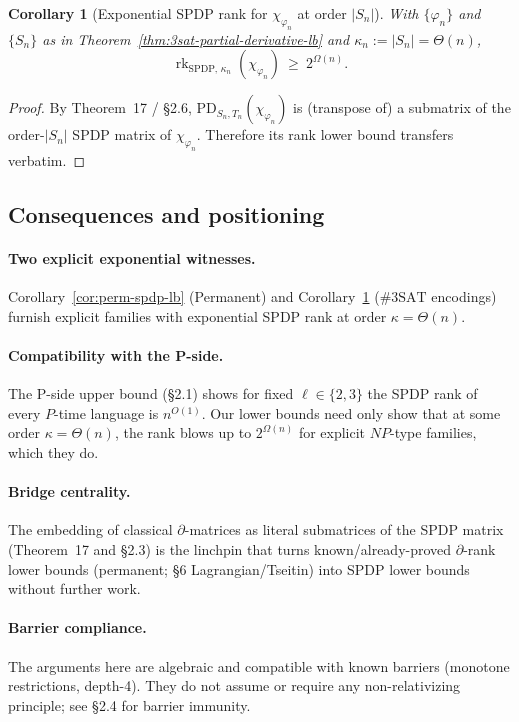 \documentclass[12pt]{article}
\newtheorem{corollary}[theorem]{Corollary}
\theoremstyle{definition}
\theoremstyle{definition}
\theoremstyle{remark}
\theoremstyle{remark}
\begin{document}
\begin{corollary}[Exponential SPDP rank for $\chi_{\varphi_n}$ at order $|S_n|$]\label{cor:3sat-spdp-lb}
With $\{\varphi_n\}$ and $\{S_n\}$ as in Theorem~\ref{thm:3sat-partial-derivative-lb} and $\kappa_n:=|S_n|=\Theta(n)$,
\[
\operatorname{rk}_{\mathrm{SPDP},\,\kappa_n}(\chi_{\varphi_n})\ \ge\ 2^{\Omega(n)}.
\]
\end{corollary}

\begin{proof}
By Theorem~17 / \S2.6, $\mathrm{PD}_{S_n,T_n}(\chi_{\varphi_n})$ is (transpose of) a submatrix of the order-$|S_n|$ SPDP matrix of $\chi_{\varphi_n}$. Therefore its rank lower bound transfers verbatim.
\end{proof}

\subsection{Consequences and positioning}

\paragraph{Two explicit exponential witnesses.}
Corollary~\ref{cor:perm-spdp-lb} (Permanent) and Corollary~\ref{cor:3sat-spdp-lb} ($\#3\mathrm{SAT}$ encodings) furnish explicit families with exponential SPDP rank at order $\kappa=\Theta(n)$.

\paragraph{Compatibility with the P-side.}
The P-side upper bound (\S2.1) shows for fixed $\ell\in\{2,3\}$ the SPDP rank of every $P$-time language is $n^{O(1)}$. Our lower bounds need only show that at some order $\kappa=\Theta(n)$, the rank blows up to $2^{\Omega(n)}$ for explicit $NP$-type families, which they do.

\paragraph{Bridge centrality.}
The embedding of classical $\partial$-matrices as literal submatrices of the SPDP matrix (Theorem~17 and \S2.3) is the linchpin that turns known/already-proved $\partial$-rank lower bounds (permanent; \S6 Lagrangian/Tseitin) into SPDP lower bounds without further work.

\paragraph{Barrier compliance.}
The arguments here are algebraic and compatible with known barriers (monotone restrictions, depth-4). They do not assume or require any non-relativizing principle; see \S2.4 for barrier immunity.
\end{document}
